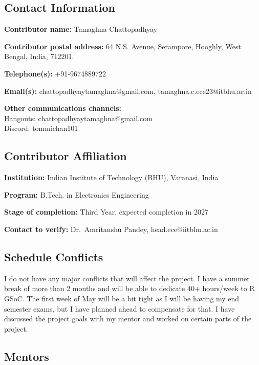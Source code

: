 \documentclass[11pt]{article}
\begin{document}
    \hypertarget{contact-information}{%
\subsection{Contact Information}\label{contact-information}}

\textbf{Contributor name:} Tamaghna Chattopadhyay

\textbf{Contributor postal address:} 64 N.S. Avenue, Serampore, Hooghly,
West Bengal, India, 712201.

\textbf{Telephone(s):} +91-9674889722

\textbf{Email(s):} chattopadhyaytamaghna@gmail.com,
tamaghna.c.ece23@itbhu.ac.in

\textbf{Other communications channels:}\\
Hangouts: chattopadhyaytamaghna@gmail.com\\
Discord: tommichan101

    \hypertarget{contributor-affiliation}{%
\subsection{Contributor Affiliation}\label{contributor-affiliation}}

\textbf{Institution:} Indian Institute of Technology (BHU), Varanasi,
India

\textbf{Program:} B.Tech. in Electronics Engineering

\textbf{Stage of completion:} Third Year, expected completion in 2027

\textbf{Contact to verify:} Dr.~Amritanshu Pandey, head.ece@iitbhu.ac.in

    \hypertarget{schedule-conflicts}{%
\subsection{Schedule Conflicts}\label{schedule-conflicts}}

I do not have any major conflicts that will affect the project. I have a
summer break of more than 2 months and will be able to dedicate 40+
hours/week to R GSoC. The first week of May will be a bit tight as I
will be having my end semester exams, but I have planned ahead to
compensate for that. I have discussed the project goals with my mentor
and worked on certain parts of the project.

    \hypertarget{mentors}{%
\subsection{Mentors}\label{mentors}}
\end{document}
